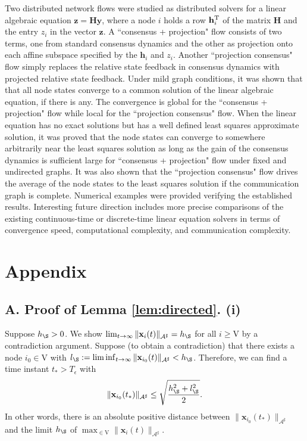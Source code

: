\documentclass[a4paper, 11pt]{article}
\def\T{^{\rm\tiny T}}
\begin{document}
Two distributed network flows were studied  as distributed solvers for a linear algebraic equation $\mathbf{z}=\mathbf{H}\mathbf{y}$, where a  node $i$ holds a row $\mathbf{h}_i\T$ of the matrix $\mathbf{H}$ and the entry $z_i$ in the vector $\mathbf{z}$. A ``consensus + projection" flow consists of two terms, one from standard consensus dynamics and the other as projection onto each affine subspace specified by the $\mathbf{h}_i$ and $z_i$.  Another  ``projection consensus" flow  simply replaces the relative state feedback in consensus dynamics with projected relative state feedback. Under mild graph conditions, it was shown that  that all node states converge to a common solution of the linear algebraic equation, if there is any. The convergence is global for the ``consensus + projection" flow while local for the ``projection consensus" flow.  When the linear equation has no exact solutions but has a well defined least squares approximate solution, it was proved  that the node states can converge to somewhere  arbitrarily near the least squares solution as long as the gain of the consensus dynamics is sufficient large for ``consensus + projection" flow under fixed and undirected graphs.  It was also shown that the ``projection consensus" flow drives the average of the node states to the least squares solution if the communication graph is complete. Numerical examples were provided verifying  the established results.  Interesting future direction includes more precise   comparisons of the existing continuous-time or discrete-time linear equation solvers in terms of convergence speed, computational complexity, and communication complexity.




\section*{Appendix}

\subsection*{A. Proof of Lemma \ref{lem:directed}. (i)}
Suppose $h_\S>0$. We show   $\lim_{t\to\infty}\|\mathbf{x}_i(t)\|_{\mathcal{A}^\sharp}=h_\S$ for all $i\geq \mathrm{V}$ by a contradiction argument. Suppose (to obtain a contradiction) that there exists a node  $i_0\in\mathrm{V}$  with $l_\S:=\liminf_{t\to\infty} \|\mathbf{x}_{i_0}(t)\|_{\mathcal{A}^\sharp}<h_\S$. Therefore, we can find a time instant $t_\ast>T_{\epsilon}$ with
\begin{align}
 \|\mathbf{x}_{i_0}(t_\ast)\|_{\mathcal{A}^\sharp}\leq \sqrt{\frac{h_\S^2+l_\S^2}{2}}.
\end{align}
In other words, there is an absolute positive distance between $\|\mathbf{x}_{i_0}(t_\ast)\|_{\mathcal{A}^\sharp}$ and the limit $h_\S$ of $ \max_{\in\mathrm{V}} \|\mathbf{x}_i(t)\|_{\mathcal{A}^\sharp}$.
\end{document}
